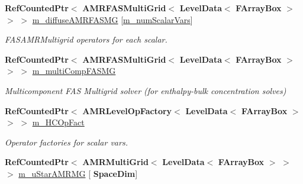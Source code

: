 \begin{DoxyCompactItemize}
\mbox{\label{class_a_m_r_level_mushy_layer_a6bc554772da0dc80eb3674e1817a309b}} 
\textbf{ Ref\+Counted\+Ptr}$<$ \textbf{ A\+M\+R\+F\+A\+S\+Multi\+Grid}$<$ \textbf{ Level\+Data}$<$ \textbf{ F\+Array\+Box} $>$ $>$ $>$ \hyperlink{class_a_m_r_level_mushy_layer_a6bc554772da0dc80eb3674e1817a309b}{m\+\_\+diffuse\+A\+M\+R\+F\+A\+S\+MG} \mbox{[}\hyperlink{mushy_layer_opt_8h_afcada9fb65a998951da882b5c10191fea83db32f5839575c9d7812f3cd0727d07}{m\+\_\+num\+Scalar\+Vars}\mbox{]}
\begin{DoxyCompactList}\small\item\em F\+A\+S\+A\+M\+R\+Multigrid operators for each scalar. \end{DoxyCompactList}\item 
\mbox{\label{class_a_m_r_level_mushy_layer_acb712abf9ec7866298cf3ea78465fc19}} 
\textbf{ Ref\+Counted\+Ptr}$<$ \textbf{ A\+M\+R\+F\+A\+S\+Multi\+Grid}$<$ \textbf{ Level\+Data}$<$ \textbf{ F\+Array\+Box} $>$ $>$ $>$ \hyperlink{class_a_m_r_level_mushy_layer_acb712abf9ec7866298cf3ea78465fc19}{m\+\_\+multi\+Comp\+F\+A\+S\+MG}
\begin{DoxyCompactList}\small\item\em Multicomponent F\+AS Multigrid solver (for enthalpy-\/bulk concentration solves) \end{DoxyCompactList}\item 
\mbox{\label{class_a_m_r_level_mushy_layer_a29d239440437c973f79bd67dd2261cf4}} 
\textbf{ Ref\+Counted\+Ptr}$<$ \textbf{ A\+M\+R\+Level\+Op\+Factory}$<$ \textbf{ Level\+Data}$<$ \textbf{ F\+Array\+Box} $>$ $>$ $>$ \hyperlink{class_a_m_r_level_mushy_layer_a29d239440437c973f79bd67dd2261cf4}{m\+\_\+\+H\+C\+Op\+Fact}
\begin{DoxyCompactList}\small\item\em Operator factories for scalar vars. \end{DoxyCompactList}\item 
\mbox{\label{class_a_m_r_level_mushy_layer_a8da3f229eb6d77528db83ea3ac696be5}} 
\textbf{ Ref\+Counted\+Ptr}$<$ \textbf{ A\+M\+R\+Multi\+Grid}$<$ \textbf{ Level\+Data}$<$ \textbf{ F\+Array\+Box} $>$ $>$ $>$ \hyperlink{class_a_m_r_level_mushy_layer_a8da3f229eb6d77528db83ea3ac696be5}{m\+\_\+u\+Star\+A\+M\+R\+MG} \mbox{[}\textbf{ Space\+Dim}\mbox{]}

\end{DoxyCompactItemize}
